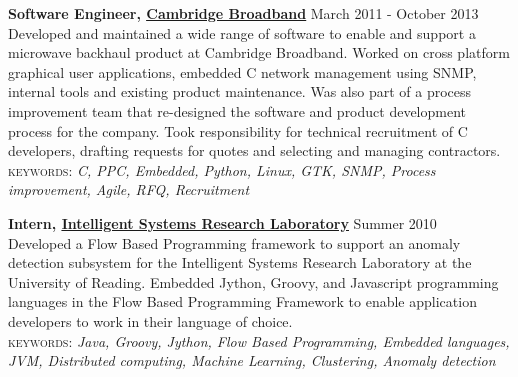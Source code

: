 \documentclass[10pt]{article}
\newcommand{\linkto}[2]{\href{#1}{\color{darkblue}\setulcolor{darkblue}\ul{#2}}}
\newcommand{\blankline}{\quad\pagebreak[2]}
\begin{document}
\blankline






\textbf{Software Engineer, \linkto{http://cbnl.com}{Cambridge Broadband} } \hfill March 2011 - October 2013 \\
Developed and maintained a wide range of software to enable and support a microwave backhaul product at Cambridge Broadband. Worked on cross platform graphical user applications, embedded C network management using SNMP, internal tools and existing product maintenance. Was also part of a process improvement team that re-designed the software and product development process for the company. Took responsibility for technical recruitment of C developers, drafting requests for quotes and selecting and managing contractors.  \\
{\small\textsc{keywords:} \emph{C, PPC, Embedded, Python, Linux, GTK, SNMP, Process improvement, Agile, RFQ, Recruitment}}

\blankline

\textbf{Intern, \linkto{http://www.isr.reading.ac.uk/}{Intelligent Systems Research Laboratory}} \hfill Summer 2010 \\
Developed a Flow Based Programming framework to support an anomaly detection subsystem for the Intelligent Systems Research Laboratory at the University of Reading. Embedded Jython, Groovy, and Javascript programming languages in the Flow Based Programming Framework to enable application developers to work in their language of choice. \\
{\small\textsc{keywords:} \emph{Java, Groovy, Jython, Flow Based Programming, Embedded languages, JVM, Distributed computing, Machine Learning, Clustering, Anomaly detection}}
\end{document}
